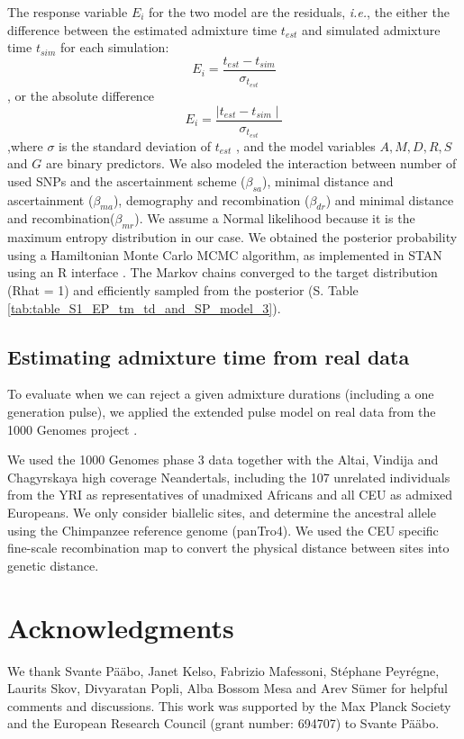 \documentclass[11pt]{article}
\begin{document}
The response variable $E_i$ for the two model are the residuals, \emph{i.e.}, the either the difference between the estimated admixture time $t_{est}$ and simulated admixture time $t_{sim}$ for each simulation:
$$E_i = \frac{t_{est} - t_{sim}}{\sigma_{t_{est}}}$$, or the absolute difference $$E_i = \frac{\mid t_{est} - t_{sim} \mid}{\sigma_{t_{est}}}$$,where $\sigma$ is the standard deviation of $t_{est}$ , and the model variables $A, M, D, R, S$ and $G$ are binary predictors. We also modeled the interaction between number of used SNPs and the ascertainment scheme ($\beta_{sa}$), minimal distance and ascertainment ($\beta_{ma}$), demography and recombination ($\beta_{dr}$) and minimal distance and recombination($\beta_{mr}$).
We assume a Normal likelihood because it is the maximum entropy distribution in our case. We obtained the posterior probability using a Hamiltonian Monte Carlo MCMC algorithm, as implemented in STAN \citep{carpenter_stan_2017} using an R interface \citep{stan_development_team_rstan_2018,mcelreath_statistical_2020}. The Markov chains converged to the target distribution (Rhat = 1) and efficiently sampled from the posterior (S. Table \ref{tab:table_S1_EP_tm_td_and_SP_model_3}).  


\subsection{Estimating admixture time from real data}\label{Estimating admixture time from real data}
To evaluate when we can reject a given admixture durations (including a one generation pulse), we applied the extended pulse model on real data from the 1000 Genomes project \citep{the_1000_genomes_project_consortium_global_2015}.

We used the 1000 Genomes phase 3 data together with the Altai, Vindija and Chagyrskaya high coverage Neandertals, including the 107 unrelated individuals from the YRI as representatives of unadmixed Africans and all CEU as admixed Europeans. We only consider biallelic sites, and determine the ancestral allele using  the Chimpanzee reference genome (panTro4). We used the CEU specific fine-scale recombination map \citep{spence_inference_2019} to convert the physical distance between sites into genetic distance. 


\section{Acknowledgments}

We thank Svante P\"a\"abo, Janet Kelso, Fabrizio Mafessoni, St\'{e}phane Peyr\'{e}gne, Laurits Skov, Divyaratan Popli, Alba Bossom Mesa and Arev S\"umer for helpful comments and discussions.
This work was supported by the Max Planck Society and the European Research Council (grant number: 694707) to Svante P\"a\"abo.
\end{document}

